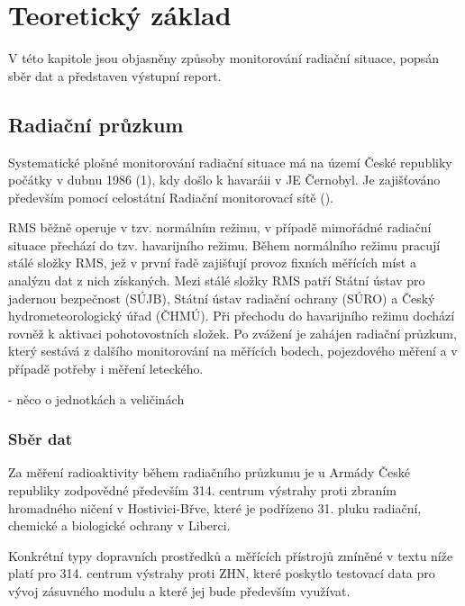 \chapter{Teoretický základ}
\label{2-teorie}

V této kapitole jsou objasněny způsoby monitorování radiační situace, popsán sběr dat a představen výstupní report.

\section{Radiační průzkum}
Systematické plošné monitorování radiační situace má na území České republiky počátky v dubnu 1986 (1), kdy došlo k havaráii v JE Černobyl. Je zajišťováno především pomocí celostátní Radiační monitorovací sítě (). 

RMS běžně operuje v tzv. normálním režimu, v případě mimořádné radiační situace přechází do tzv. havarijního režimu. Během normálního režimu pracují stálé složky RMS, jež v první řadě zajišťují provoz fixních měřících míst a analýzu dat z nich získaných. Mezi stálé složky RMS patří Státní ústav pro jadernou bezpečnost {\zk(SÚJB)}, Státní ústav radiační ochrany {\zk(SÚRO)} a Český hydrometeorologický úřad {\zk(ČHMÚ)}. Při přechodu do havarijního režimu dochází rovněž k aktivaci pohotovostních složek. Po zvážení je zahájen radiační průzkum, který sestává z dalšího monitorování na měřících bodech, pojezdového měření a v případě potřeby i měření leteckého.

- něco o jednotkách a veličinách



\subsection{Sběr dat}

Za měření radioaktivity během radiačního průzkumu je u Armády České republiky zodpovědné především 314. centrum výstrahy proti zbraním hromadného ničení v Hostivici-Břve, které je podřízeno 31. pluku radiační, chemické a biologické ochrany v Liberci. 
 
	Konkrétní typy dopravních prostředků a měřících přístrojů zmíněné v textu níže platí pro 314. centrum výstrahy proti ZHN, které poskytlo testovací data pro vývoj zásuvného modulu a které jej bude především využívat. 

